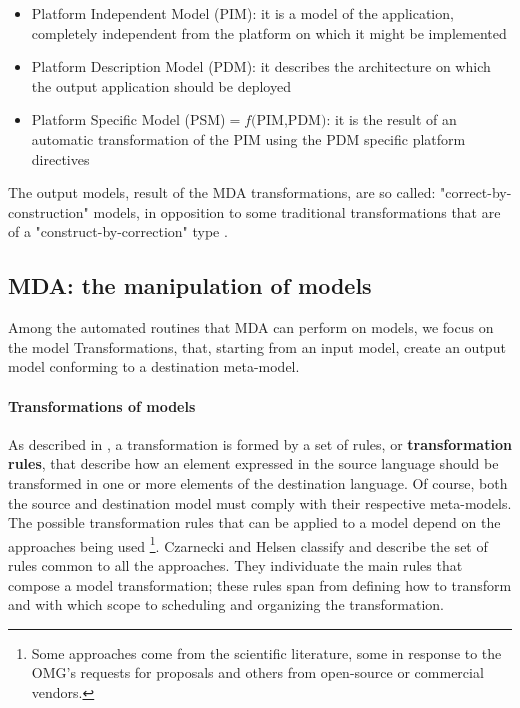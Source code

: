 \begin{itemize}
 \item Platform Independent Model (PIM): it is a model of the application, completely independent from the platform on which it might be implemented
 \item Platform Description Model (PDM): it describes the architecture on which the output application should be deployed
 \item Platform Specific Model (PSM)$=f($PIM,PDM$)$: it is the result of an automatic transformation of the PIM using the PDM specific platform directives  
\end{itemize}

The output models, result of the MDA transformations, are so called: "correct-by-construction" models, in opposition to some traditional transformations that are of a "construct-by-correction" type \cite{Marrone}.   


\subsection{MDA: the manipulation of models}
\label{MDAModelManipulation}
Among the automated routines that MDA can perform on models, we focus on the model Transformations, that, starting from an input model, create an output model conforming to a destination meta-model. 

\paragraph{Transformations of models}
As described in \cite{Papa11}, a transformation is formed by a set of rules, or \textbf{transformation rules}, that describe how an element expressed in the source language should be transformed in one or more elements of the destination language.
Of course, both the source and destination model must comply with their respective meta-models.
The possible transformation rules that can be applied to a model depend on the approaches being used \footnote{Some approaches come from the scientific literature, some in response to the OMG's requests for proposals and others from open-source or commercial vendors.}. Czarnecki and Helsen \cite{Czarnecki03classificationof} classify and describe the set of rules common to all the approaches.
They individuate the main rules that compose a model transformation; these rules span from defining how to transform and with which scope to scheduling and organizing the transformation.


